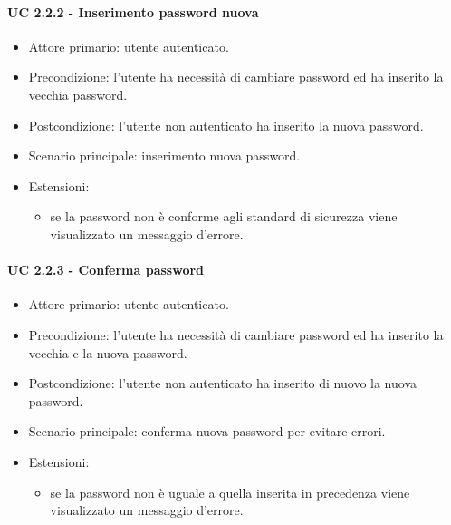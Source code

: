         \paragraph{UC 2.2.2 - Inserimento password nuova}
            \begin{itemize}
                \item Attore primario: utente autenticato.
                \item Precondizione: l'utente ha necessità di cambiare password ed ha inserito la vecchia password.
                \item Postcondizione: l'utente non autenticato ha inserito la nuova password.
                \item Scenario principale: inserimento nuova password.
                \item Estensioni:
                    \begin{itemize}
                        \item se la password non è conforme agli standard di sicurezza viene visualizzato un messaggio d'errore.
                    \end{itemize}
            \end{itemize}
        \paragraph{UC 2.2.3 - Conferma password}
            \begin{itemize}
                \item Attore primario: utente autenticato.
                \item Precondizione: l'utente ha necessità di cambiare password ed ha inserito la vecchia e la nuova password.
                \item Postcondizione: l'utente non autenticato ha inserito di nuovo la nuova password.
                \item Scenario principale: conferma nuova password per evitare errori.
                \item Estensioni:
                    \begin{itemize}
                        \item se la password non è uguale a quella inserita in precedenza viene visualizzato un messaggio d'errore.
                    \end{itemize}
            \end{itemize}




